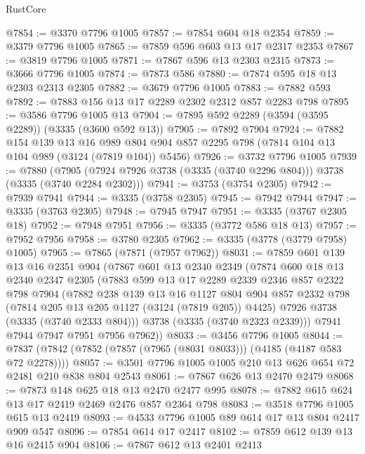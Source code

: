 \begin{lexlean}{RustCore}
\begin{coremodule}
@7854 := @3370 @7796 @1005
@7857 := @7854 @604 @18 @2354
@7859 := @3379 @7796 @1005
@7865 := @7859 @596 @603 @13 @17 @2317 @2353
@7867 := @3819 @7796 @1005
@7871 := @7867 @596 @13 @2303 @2315
@7873 := @3666 @7796 @1005
@7874 := @7873 @586
@7880 := @7874 @595 @18 @13 @2303 @2313 @2305
@7882 := @3679 @7796 @1005
@7883 := @7882 @593
@7892 := @7883 @156 @13 @17 @2289 @2302 @2312 @857 @2283 @798
@7895 := @3586 @7796 @1005 @13
@7904 := @7895 @592 @2289 (@3594 (@3595 @2289)) (@3335 (@3600 @592 @13))
@7905 := @7892 @7904
@7924 := @7882
    @154
    @139
    @13
    @16
    @989
    @804
    @904
    @857
    @2295
    @798
    (@7814 @104 @13 @104 @989 (@3124 (@7819 @104)) @5456)
@7926 := @3732 @7796 @1005
@7939 := @7880
    (@7905 (@7924 @7926 @3738 (@3335 (@3740 @2296 @804))) @3738 (@3335 (@3740 @2284 @2302)))
@7941 := @3753 (@3754 @2305)
@7942 := @7939 @7941
@7944 := @3335 (@3758 @2305)
@7945 := @7942 @7944
@7947 := @3335 (@3763 @2305)
@7948 := @7945 @7947
@7951 := @3335 (@3767 @2305 @18)
@7952 := @7948 @7951
@7956 := @3335 (@3772 @586 @18 @13)
@7957 := @7952 @7956
@7958 := @3780 @2305
@7962 := @3335 (@3778 (@3779 @7958) @1005)
@7965 := @7865 (@7871 (@7957 @7962))
@8031 := @7859
    @601
    @139
    @13
    @16
    @2351
    @904
    (@7867
      @601
      @13
      @2340
      @2349
      (@7874
        @600
        @18
        @13
        @2340
        @2347
        @2305
        (@7883
          @599
          @13
          @17
          @2289
          @2339
          @2346
          @857
          @2322
          @798
          @7904
          (@7882
            @238
            @139
            @13
            @16
            @1127
            @804
            @904
            @857
            @2332
            @798
            (@7814 @205 @13 @205 @1127 (@3124 (@7819 @205)) @4425)
            @7926
            @3738
            (@3335 (@3740 @2333 @804)))
          @3738
          (@3335 (@3740 @2323 @2339)))
        @7941
        @7944
        @7947
        @7951
        @7956
        @7962))
@8033 := @3456 @7796 @1005
@8044 := @7837 (@7842 (@7852 (@7857 (@7965 (@8031 @8033))) (@4185 (@4187 @583 @72 @2278))))
@8057 := @3501 @7796 @1005 @1005 @210 @13 @626 @654 @72 @2481 @210 @838 @804 @2543
@8061 := @7867 @626 @13 @2470 @2479
@8068 := @7873 @148 @625 @18 @13 @2470 @2477 @995
@8078 := @7882 @615 @624 @13 @17 @2419 @2469 @2476 @857 @2364 @798
@8083 := @3518 @7796 @1005 @615 @13 @2419
@8093 := @4533 @7796 @1005 @89 @614 @17 @13 @804 @2417 @909 @547
@8096 := @7854 @614 @17 @2417
@8102 := @7859 @612 @139 @13 @16 @2415 @904
@8106 := @7867 @612 @13 @2401 @2413

\end{coremodule}
\end{lexlean}
